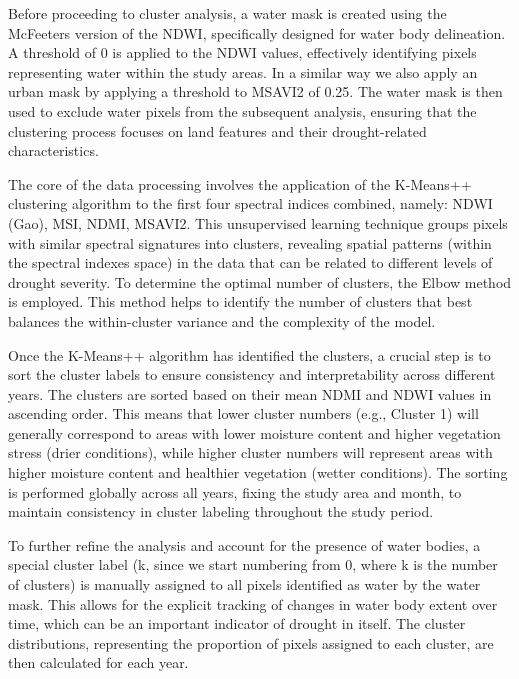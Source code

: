 \documentclass[10pt,twocolumn]{article}
\begin{document}
Before proceeding to cluster analysis, a water mask is created using the McFeeters version of the NDWI, specifically designed for water body delineation. A threshold of 0 is applied to the NDWI values, effectively identifying pixels representing water within the study areas. In a similar way we also apply an urban mask by applying a threshold to MSAVI2 of 0.25. The water mask is then used to exclude water pixels from the subsequent analysis, ensuring that the clustering process focuses on land features and their drought-related characteristics.

The core of the data processing involves the application of the K-Means++ \cite{huang2014extensions} clustering algorithm to the first four spectral indices combined, namely: NDWI (Gao), MSI, NDMI, MSAVI2. This unsupervised learning technique groups pixels with similar spectral signatures into clusters, revealing spatial patterns (within the spectral indexes space) in the data that can be related to different levels of drought severity. To determine the optimal number of clusters, the Elbow method is employed. This method helps to identify the number of clusters that best balances the within-cluster variance and the complexity of the model.

Once the K-Means++ algorithm has identified the clusters, a crucial step is to sort the cluster labels to ensure consistency and interpretability across different years. The clusters are sorted based on their mean NDMI and NDWI values in ascending order. This means that lower cluster numbers (e.g., Cluster 1) will generally correspond to areas with lower moisture content and higher vegetation stress (drier conditions), while higher cluster numbers will represent areas with higher moisture content and healthier vegetation (wetter conditions). The sorting is performed globally across all years, fixing the study area and month, to maintain consistency in cluster labeling throughout the study period.

To further refine the analysis and account for the presence of water bodies, a special cluster label (k, since we start numbering from 0, where k is the number of clusters) is manually assigned to all pixels identified as water by the water mask. This allows for the explicit tracking of changes in water body extent over time, which can be an important indicator of drought in itself. The cluster distributions, representing the proportion of pixels assigned to each cluster, are then calculated for each year. 
\end{document}
